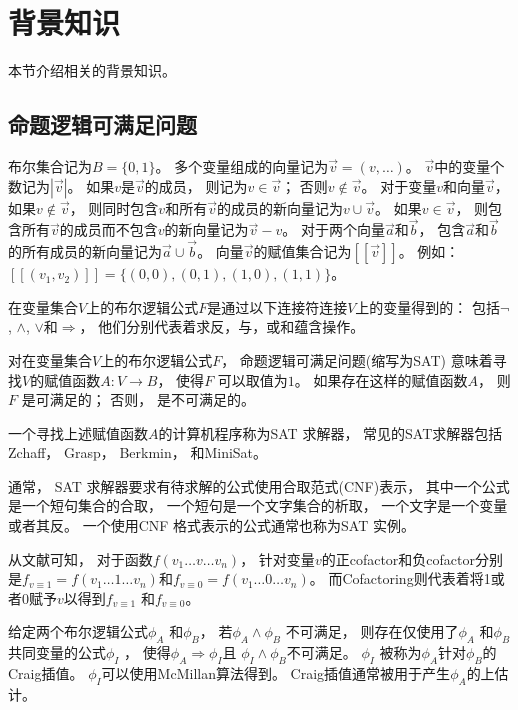 \section{背景知识}\label{sec_prem}
本节介绍相关的背景知识。
\subsection{命题逻辑可满足问题}\label{subsec_SAT}
布尔集合记为$B=\{0,1\}$。
多个变量组成的向量记为$\vec{v}=(v,\dots)$。
$\vec{v}$中的变量个数记为$|\vec{v}|$。
如果$v$是$\vec{v}$的成员，
则记为$v\in\vec{v}$；
否则$v\notin\vec{v}$。
对于变量$v$和向量$\vec{v}$，
如果$v\notin\vec{v}$，
则同时包含$v$和所有$\vec{v}$的成员的新向量记为$v\cup\vec{v}$。
如果$v\in \vec{v}$，
则包含所有$\vec{v}$的成员而不包含$v$的新向量记为$\vec{v}-v$。
对于两个向量$\vec{a}$和$\vec{b}$，
包含$\vec{a}$和$\vec{b}$的所有成员的新向量记为$\vec{a}\cup\vec{b}$。
向量$\vec{v}$的赋值集合记为$[\![\vec{v}]\!]$。
例如：
$[\![(v_1,v_2)]\!]=\{(0,0),(0,1),(1,0),(1,1)\}$。

在变量集合$V$上的布尔逻辑公式$F$是通过以下连接符连接$V$上的变量得到的：
包括$\neg$, $\wedge$, $\vee$和$\Rightarrow$，
他们分别代表着求反，与，或和蕴含操作。

对在变量集合$V$上的布尔逻辑公式$F$，
命题逻辑可满足问题(缩写为SAT)
意味着寻找$V$的赋值函数$A:V\to B$，
使得$F$ 可以取值为$1$。
如果存在这样的赋值函数$A$，
则$F$ 是可满足的；
否则，
是不可满足的。

一个寻找上述赋值函数$A$的计算机程序称为SAT 求解器，
常见的SAT求解器包括Zchaff，
Grasp，
Berkmin，
和MiniSat。


通常，
SAT 求解器要求有待求解的公式使用合取范式(CNF)表示，
其中一个公式是一个短句集合的合取，
一个短句是一个文字集合的析取，
一个文字是一个变量或者其反。
一个使用CNF 格式表示的公式通常也称为SAT 实例。


从文献可知，
对于函数$f(v_1\dots v\dots v_n)$，
针对变量$v$的正cofactor和负cofactor分别是$f_{v\equiv 1}=f(v_1\dots 1\dots v_n)$和$f_{v\equiv 0}=f(v_1\dots 0\dots v_n)$。
而Cofactoring则代表着将1或者0赋予$v$以得到$f_{v\equiv 1}$ 和$f_{v\equiv 0}$。

给定两个布尔逻辑公式$\phi_A$ 和$\phi_B$，
若$\phi_A\wedge \phi_B$ 不可满足，
则存在仅使用了$\phi_A$ 和$\phi_B$共同变量的公式$\phi_I$ ，
 使得$\phi_A\Rightarrow \phi_I$且
$\phi_I\wedge \phi_B$不可满足。
$\phi_I$ 被称为$\phi_A$针对$\phi_B$的Craig插值。
$\phi_I$可以使用McMillan算法得到。
Craig插值通常被用于产生$\phi_A$的上估计。


